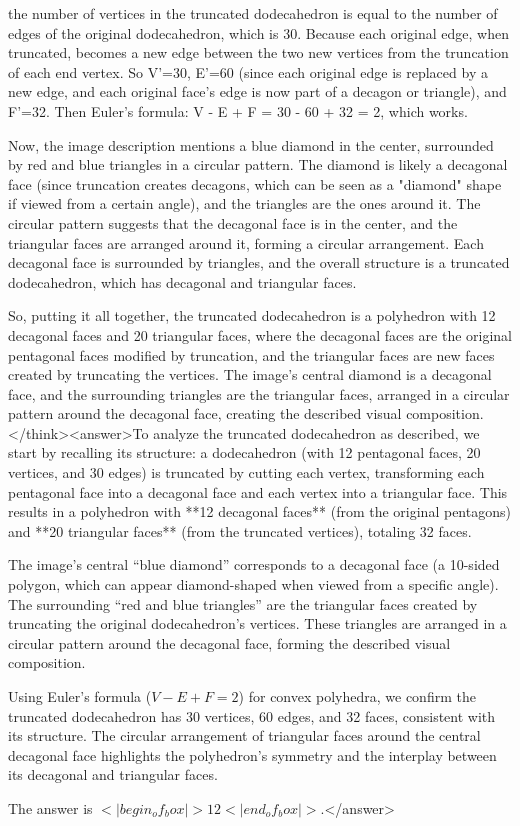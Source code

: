 the number of vertices in the truncated dodecahedron is equal to the number of edges of the original dodecahedron, which is 30. Because each original edge, when truncated, becomes a new edge between the two new vertices from the truncation of each end vertex. So V'=30, E'=60 (since each original edge is replaced by a new edge, and each original face's edge is now part of a decagon or triangle), and F'=32. Then Euler's formula: V - E + F = 30 - 60 + 32 = 2, which works. 

Now, the image description mentions a blue diamond in the center, surrounded by red and blue triangles in a circular pattern. The diamond is likely a decagonal face (since truncation creates decagons, which can be seen as a "diamond" shape if viewed from a certain angle), and the triangles are the ones around it. The circular pattern suggests that the decagonal face is in the center, and the triangular faces are arranged around it, forming a circular arrangement. Each decagonal face is surrounded by triangles, and the overall structure is a truncated dodecahedron, which has decagonal and triangular faces. 

So, putting it all together, the truncated dodecahedron is a polyhedron with 12 decagonal faces and 20 triangular faces, where the decagonal faces are the original pentagonal faces modified by truncation, and the triangular faces are new faces created by truncating the vertices. The image's central diamond is a decagonal face, and the surrounding triangles are the triangular faces, arranged in a circular pattern around the decagonal face, creating the described visual composition.</think><answer>To analyze the truncated dodecahedron as described, we start by recalling its structure: a dodecahedron (with 12 pentagonal faces, 20 vertices, and 30 edges) is truncated by cutting each vertex, transforming each pentagonal face into a decagonal face and each vertex into a triangular face. This results in a polyhedron with **12 decagonal faces** (from the original pentagons) and **20 triangular faces** (from the truncated vertices), totaling 32 faces.  

The image’s central “blue diamond” corresponds to a decagonal face (a 10-sided polygon, which can appear diamond-shaped when viewed from a specific angle). The surrounding “red and blue triangles” are the triangular faces created by truncating the original dodecahedron’s vertices. These triangles are arranged in a circular pattern around the decagonal face, forming the described visual composition.  

Using Euler’s formula (\(V - E + F = 2\)) for convex polyhedra, we confirm the truncated dodecahedron has 30 vertices, 60 edges, and 32 faces, consistent with its structure. The circular arrangement of triangular faces around the central decagonal face highlights the polyhedron’s symmetry and the interplay between its decagonal and triangular faces.  

The answer is \(<|begin_of_box|>12<|end_of_box|>\).</answer>
